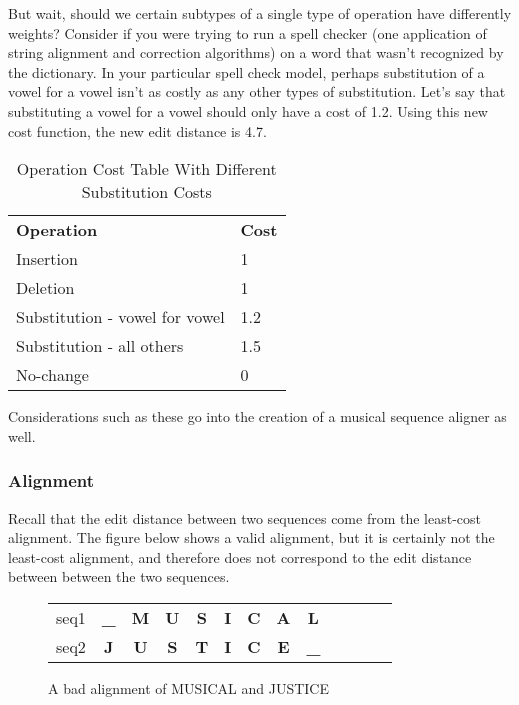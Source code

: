 But wait, should we certain subtypes of a single type of operation have differently weights? Consider if you were trying to run a spell checker (one application of string alignment and correction algorithms) on a word that wasn't recognized by the dictionary. In your particular spell check model, perhaps substitution of a vowel for a vowel isn't as costly as any other types of substitution. Let's say that substituting a vowel for a vowel should only have a cost of 1.2. Using this new cost function, the new edit distance is 4.7.
\begin{table}[!h]
\centering
\begin{tabular}{ll}
\textbf{Operation}             & \textbf{Cost} \\
Insertion                      & 1             \\
Deletion                       & 1             \\
Substitution - vowel for vowel & 1.2           \\
Substitution - all others      & 1.5           \\
No-change                      & 0                
\end{tabular}
\caption{Operation Cost Table With Different Substitution Costs}
\label{my-label3}
\end{table}

Considerations such as these go into the creation of a musical sequence aligner as well. 
\subsubsection{Alignment}

Recall that the edit distance between two sequences come from the least-cost alignment. The figure below shows a valid alignment, but it is certainly not the least-cost alignment, and therefore does not correspond to the edit distance between between the two sequences. 

\begin{figure}[!h]
\centering
\begin{tabular}{lcccccccccccc}
seq1 & {\color[HTML]{009901} \textbf{\_}} & {\color[HTML]{6200C9} \textbf{M}} & {\color[HTML]{6200C9} \textbf{U}} & {\color[HTML]{6200C9} \textbf{S}} & \textbf{I} & \textbf{C} & {\color[HTML]{6200C9} \textbf{A}} & {\color[HTML]{9A0000} \textbf{L}}  & \textbf{} & \textbf{} & \textbf{} &  \\
seq2 & {\color[HTML]{009901} \textbf{J}}  & {\color[HTML]{6200C9} \textbf{U}} & {\color[HTML]{6200C9} \textbf{S}} & {\color[HTML]{6200C9} \textbf{T}} & \textbf{I} & \textbf{C} & {\color[HTML]{6200C9} \textbf{E}} & {\color[HTML]{9A0000} \textbf{\_}} & \textbf{} & \textbf{} & \textbf{} & 
\end{tabular}
\caption{A bad alignment of MUSICAL and JUSTICE}
\label{badalign}
\end{figure}

